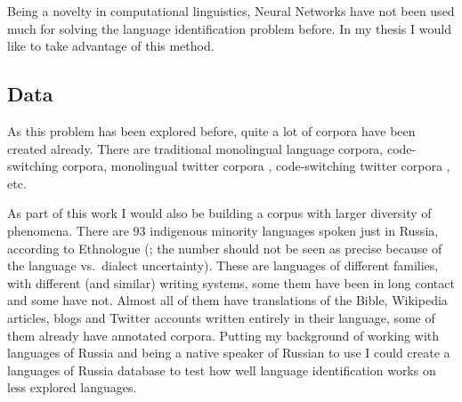 Being a novelty in computational linguistics, Neural Networks have not been used much for solving the language identification problem before. In my thesis I would like to take advantage of this method.%


\subsection{Data}


As this problem has been explored before, quite a lot of corpora have been created already. There are traditional monolingual language corpora, code-switching corpora, monolingual twitter corpora \parencite{vrl2014accurate}, code-switching twitter corpora \parencite{maharjan2015developing, vrl2010multilingual}, etc.

As part of this work I would also be building a corpus with larger diversity of phenomena. There are 93 indigenous minority languages spoken just in Russia, according to Ethnologue (\parencite{lewis2009ethnologue}; the number should not be seen as precise because of the language vs.\ dialect uncertainty). These are languages of different families, with different (and similar) writing systems, some them have been in long contact and some have not. Almost all of them have translations of the Bible, Wikipedia articles, blogs and Twitter accounts written entirely in their language, some of them already have annotated corpora. Putting my background of working with languages of Russia and being a native speaker of Russian to use I could create a languages of Russia database to test how well language identification works on less explored languages.




